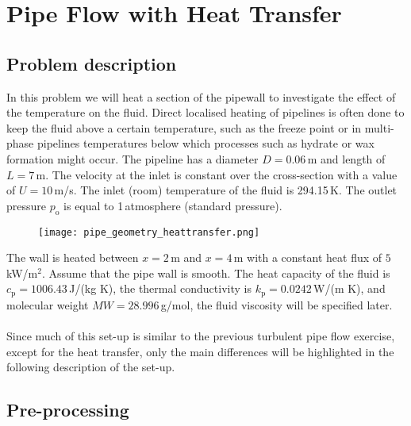 \documentclass[11pt,a4paper,oneside]{scrartcl}
\begin{document}
\section{Pipe Flow with Heat Transfer}\label{Part2}

\subsection{Problem description}

In this problem we will heat a section of the pipewall to investigate the effect of the temperature on the fluid. Direct localised heating of pipelines is often done to keep the fluid  above a certain temperature, such as the freeze point or in multi-phase pipelines temperatures below which processes such as hydrate or wax formation might occur. The pipeline has a diameter $D=0.06$\,m and  length of $L=7$\,m. The velocity at the inlet is constant over the cross-section with a value of $U=10$\,m/s. The inlet (room) temperature of the fluid is 294.15\,K. The outlet pressure $p_\mathrm{o}$ is equal to 1\,atmosphere (standard pressure).\\

\begin{figure}[H]
\begin{center}
    \texttt{[image: pipe\_geometry\_heattransfer.png]}
\end{center}
\end{figure}

The wall is heated between $x=2$\,m and $x=4\,$m with a constant heat flux of $5\,$kW/m$^2$. Assume that the pipe wall   is smooth. The heat capacity of the fluid is $c_\mathrm{p}=1006.43\,$J/(kg K), the thermal conductivity is $k_\mathrm{p}=0.0242$\,W/(m K), and molecular weight $MW=28.996$\,g/mol, the fluid viscosity will be specified later.
\\
\\
Since much of this set-up is similar to the previous turbulent pipe flow exercise, except for the heat transfer, only the main differences will be highlighted in the following description of the set-up.

\subsection{Pre-processing}
\end{document}
